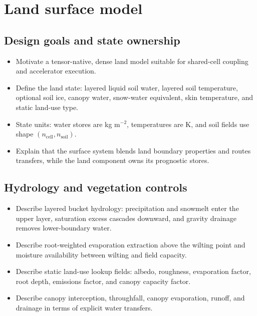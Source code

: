 
\section{Land surface model}\label{sec:land}

\subsection{Design goals and state ownership}
\begin{itemize}
  \item Motivate a tensor-native, dense land model suitable for shared-cell coupling and accelerator execution.
  \item Define the land state: layered liquid soil water, layered soil temperature, optional soil ice, canopy water, snow-water equivalent, skin temperature, and static land-use type.
  \item State units: water stores are kg m$^{-2}$, temperatures are K, and soil fields use shape $(n_{\mathrm{cell}}, n_{\mathrm{soil}})$.
  \item Explain that the surface system blends land boundary properties and routes transfers, while the land component owns its prognostic stores.
\end{itemize}
\subsection{Hydrology and vegetation controls}
\begin{itemize}
  \item Describe layered bucket hydrology: precipitation and snowmelt enter the upper layer, saturation excess cascades downward, and gravity drainage removes lower-boundary water.
  \item Describe root-weighted evaporation extraction above the wilting point and moisture availability between wilting and field capacity.
  \item Describe static land-use lookup fields: albedo, roughness, evaporation factor, root depth, emissions factor, and canopy capacity factor.
  \item Describe canopy interception, throughfall, canopy evaporation, runoff, and drainage in terms of explicit water transfers.
\end{itemize}

